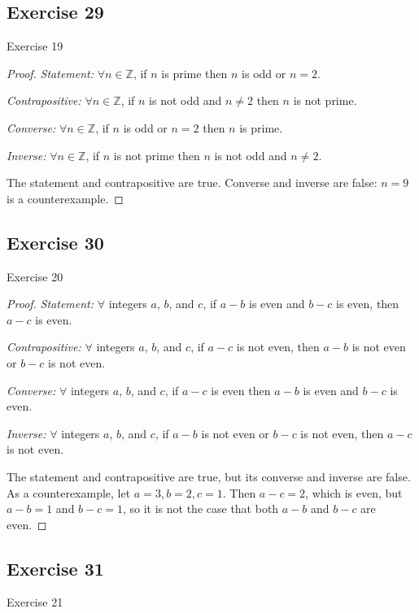 \documentclass[14pt]{extarticle}
\newcommand{\Z}{\mathbb{Z}}
\newcommand{\fa}{\forall}
\begin{document}
\subsection{Exercise 29}
Exercise 19

\begin{proof}
    {\it Statement:} $\fa n \in \Z$, if $n$ is prime then $n$ is odd or $n = 2$.

        {\it Contrapositive:} $\fa n \in \Z$, if $n$ is not odd and $n \neq 2$ then $n$ is not prime.

        {\it Converse:} $\fa n \in \Z$, if $n$ is odd or $n = 2$ then $n$ is prime.

        {\it Inverse:} $\fa n \in \Z$, if $n$ is not prime then $n$ is not odd and $n \neq 2$.

    The statement and contrapositive are true. Converse and inverse are false: $n = 9$ is a counterexample.
\end{proof}

\subsection{Exercise 30}
Exercise 20

\begin{proof}
    {\it Statement:} $\fa$ integers $a$, $b$, and $c$, if $a - b$ is even and $b - c$ is even, then $a - c$ is even.

        {\it Contrapositive:} $\fa$ integers $a$, $b$, and $c$, if $a - c$ is not even, then $a - b$ is not even or $b - c$ is not even.

        {\it Converse:} $\fa$ integers $a$, $b$, and $c$, if $a - c$ is even then $a - b$ is even and $b - c$ is even.

        {\it Inverse:} $\fa$ integers $a$, $b$, and $c$, if $a - b$ is not even or $b - c$ is not even, then $a - c$ is not even.

    The statement and contrapositive are true, but its converse and inverse are false. As a counterexample, let $a = 3, b = 2, c = 1$. Then $a - c = 2$, which is even, but $a - b = 1$ and $b - c = 1$, so it is not the case that both $a - b$ and $b - c$ are even.
\end{proof}

\subsection{Exercise 31}
Exercise 21
\end{document}
